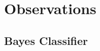\documentclass[a4paper]{article}
\begin{document}

\section{Observations}
	\subsection{Bayes Classifier} 
\end{document}

